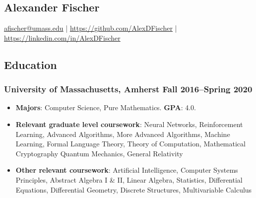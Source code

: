 \documentclass{article}
\begin{document}
	\begin{center}
		\section*{Alexander Fischer}
			\href{mailto:afischer@umass.edu}{afischer@umass.edu} | \href{https://github.com/AlexDFischer}{https://github.com/AlexDFischer} | \href{https://linkedin.com/in/AlexDFischer}{https://linkedin.com/in/AlexDFischer}
    \end{center}
	\subsection*{Education}
		\subsubsection*{University of Massachusetts, Amherst \hfill \normalfont \normalsize Fall 2016--Spring 2020}
			\begin{itemize}[noitemsep,leftmargin=40pt]
				\item \textbf{Majors}: Computer Science, Pure Mathematics. \textbf{GPA}: 4.0.
				\item \textbf{Relevant graduate level coursework}: Neural Networks, Reinforcement Learning, Advanced Algorithms, More Advanced Algorithms, Machine Learning, Formal Language Theory, Theory of Computation, Mathematical Cryptography Quantum Mechanics, General Relativity
				\item \textbf{Other relevant coursework}: Artificial Intelligence, Computer Systems Principles, Abstract Algebra I \& II, Linear Algebra, Statistics, Differential Equations, Differential Geometry, Discrete Structures, Multivariable Calculus
			\end{itemize}
\end{document}
